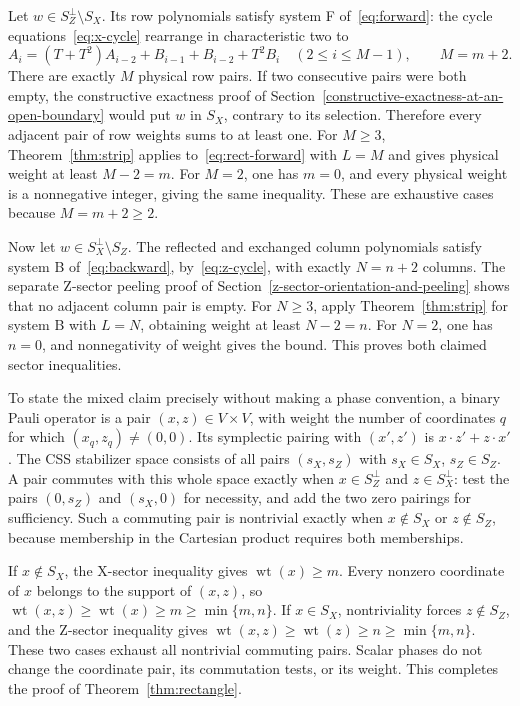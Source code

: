 \documentclass{article}
\DeclareMathOperator{\wt}{wt}
\begin{document}
Let \(w\in S_Z^\perp\setminus S_X\). Its row polynomials satisfy system F of~\eqref{eq:forward}:
the cycle equations~\eqref{eq:x-cycle}
rearrange in characteristic two to
\begin{equation}\label{eq:rect-forward}
 A_i=(T+T^2)A_{i-2}+B_{i-1}+B_{i-2}+T^2B_i
 \quad(2\le i\le M-1),\qquad M=m+2.
\end{equation}
There are exactly \(M\) physical row pairs. If two consecutive pairs were
both empty, the constructive exactness proof of
Section~\ref{constructive-exactness-at-an-open-boundary} would put \(w\) in \(S_X\),
contrary to its selection. Therefore every adjacent pair of row weights
sums to at least one. For \(M\ge3\), Theorem~\ref{thm:strip} applies to~\eqref{eq:rect-forward} with
\(L=M\) and gives physical weight at least \(M-2=m\).
For \(M=2\), one has \(m=0\), and every physical weight is a nonnegative
integer, giving the same inequality. These are exhaustive cases because
\(M=m+2\ge2\).

Now let \(w\in S_X^\perp\setminus S_Z\). The reflected and exchanged column
polynomials satisfy system B of~\eqref{eq:backward}, by~\eqref{eq:z-cycle}, with exactly \(N=n+2\) columns. The separate
Z-sector peeling proof of Section~\ref{z-sector-orientation-and-peeling} shows that no adjacent column pair is empty.
For \(N\ge3\), apply Theorem~\ref{thm:strip} for system B with \(L=N\), obtaining
weight at least \(N-2=n\). For \(N=2\), one has \(n=0\), and nonnegativity
of weight gives the bound. This proves both claimed sector inequalities.

To state the mixed claim precisely without making a phase convention,
a binary Pauli operator is a pair \((x,z)\in V\times V\), with weight the
number of coordinates \(q\) for which \((x_q,z_q)\ne(0,0)\).
Its symplectic pairing with \((x',z')\) is
\(x\cdot z'+z\cdot x'\). The CSS stabilizer space consists of all pairs
\((s_X,s_Z)\) with \(s_X\in S_X\), \(s_Z\in S_Z\). A pair commutes with
this whole space exactly when \(x\in S_Z^\perp\) and \(z\in S_X^\perp\):
test the pairs \((0,s_Z)\) and \((s_X,0)\) for necessity, and add the two
zero pairings for sufficiency. Such a commuting pair is nontrivial exactly
when \(x\notin S_X\) or \(z\notin S_Z\), because membership in the
Cartesian product requires both memberships.

If \(x\notin S_X\), the X-sector inequality gives \(\wt(x)\ge m\).
Every nonzero coordinate of \(x\) belongs to the support of \((x,z)\),
so \(\wt(x,z)\ge\wt(x)\ge m\ge\min\{m,n\}\).
If \(x\in S_X\), nontriviality forces \(z\notin S_Z\), and the
Z-sector inequality gives
\(\wt(x,z)\ge\wt(z)\ge n\ge\min\{m,n\}\).
These two cases exhaust all nontrivial commuting pairs. Scalar phases do
not change the coordinate pair, its commutation tests, or its weight.
This completes the proof of Theorem~\ref{thm:rectangle}.
\end{document}
